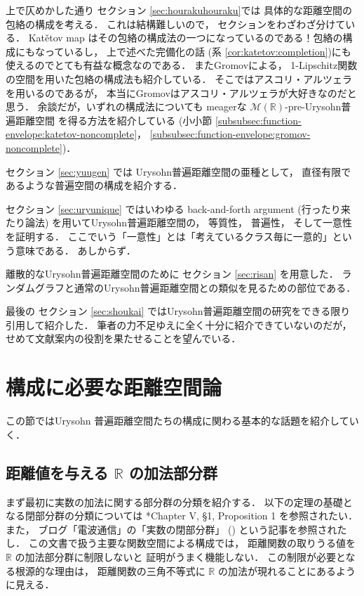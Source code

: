 \documentclass[leqno, 12pt]{jsarticle}
\newcommand{\rr}{\mathbb{R}}
\newcommand{\Met}[1]{\mathscr{M}(#1)}
\begin{document}
上で仄めかした通り
セクション
\ref{sec:hourakuhouraku}では
具体的な距離空間の包絡の構成を考える．
これは結構難しいので，%
セクションをわざわざ分けている．
Kat\v{e}tov map
はその包絡の構成法の一つになっているのである！包絡の構成にもなっているし，%
上で述べた完備化の話
(系
\ref{cor:katetov:completion})にも使えるのでとても有益な概念なのである．
またGromovによる，
1-Lipschitz関数の空間を用いた包絡の構成法も紹介している．
そこではアスコリ・アルツェラを用いるのであるが，
本当にGromovはアスコリ・アルツェラが大好きなのだと思う．
余談だが，いずれの構成法についても
meagerな
$\Met{\rr}$-pre-Urysohn普遍距離空間
を得る方法を紹介している
(小小節
\ref{subsubsec:function-envelope:katetov-noncomplete}，
\ref{subsubsec:function-envelope:gromov-noncomplete})．

セクション
\ref{sec:yuugen}
では
Urysohn普遍距離空間の亜種として，%
直径有限であるような普遍空間の構成を紹介する．



セクション
\ref{sec:uryunique}
ではいわゆる
back-and-forth argument (行ったり来たり論法)
を用いてUrysohn普遍距離空間の，
等質性，%
普遍性，%
そして一意性を証明する．
ここでいう「一意性」とは「考えているクラス毎に一意的」という意味である．%
あしからず．


離散的なUrysohn普遍距離空間のために
セクション
\ref{sec:risan}
を用意した．
ランダムグラフと通常のUrysohn普遍距離空間との類似を見るための部位である．

最後の
セクション
\ref{sec:shoukai}
ではUrysohn普遍距離空間の研究をできる限り引用して紹介した．%
筆者の力不足ゆえに全く十分に紹介できていないのだが，%
せめて文献案内の役割を果たせることを望んでいる．



\newpage
\section{構成に必要な距離空間論}\label{sec:preliminaries}
この節ではUrysohn
普遍距離空間たちの構成に関わる基本的な話題を紹介していく．

\subsection{距離値を与える\texorpdfstring{%
$\rr$%
}{R}の加法部分群}\label{subsec:preliminaries:additive-subgroups}
まず最初に実数の加法に関する部分群の分類を紹介する．
以下の定理の基礎となる閉部分群の分類については
\cite{BourbakiV}*{Chapter V, \S 1, Proposition 1}
を参照されたい．
また，
ブログ「電波通信」の「実数の閉部分群」
(\cite{denpaGR})
という記事を参照されたし．
この文書で扱う主要な関数空間による構成では，
距離関数の取りうる値を
$\rr$
の加法部分群に制限しないと
証明がうまく機能しない．
この制限が必要となる根源的な理由は，
距離関数の三角不等式に
$\rr$
の加法が現れることにあるように見える．
\end{document}
